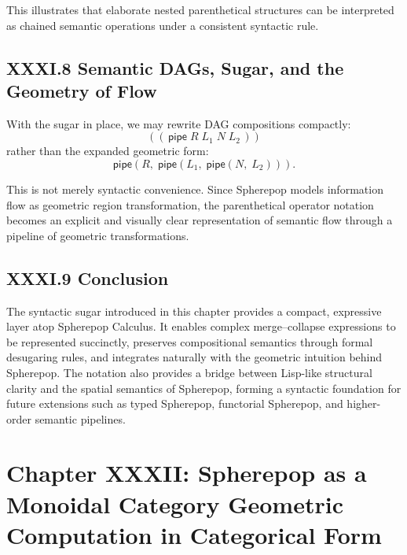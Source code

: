 \documentclass[12pt,letterpaper]{article}
\begin{document}
This illustrates that elaborate nested parenthetical structures can be interpreted as chained semantic operations under a consistent syntactic rule.

\subsection{XXXI.8 Semantic DAGs, Sugar, and the Geometry of Flow}

With the sugar in place, we may rewrite DAG compositions compactly:
\[
((\,\mathsf{pipe}\; R\; L_1\; N\; L_2\,))
\]
rather than the expanded geometric form:
\[
\mathsf{pipe}(R,\; \mathsf{pipe}(L_1,\; \mathsf{pipe}(N,\; L_2))).
\]

This is not merely syntactic convenience. Since Spherepop models information flow as geometric region transformation, the parenthetical operator notation becomes an explicit and visually clear representation of semantic flow through a pipeline of geometric transformations.

\subsection{XXXI.9 Conclusion}

The syntactic sugar introduced in this chapter provides a compact, expressive layer atop Spherepop Calculus. It enables complex merge--collapse expressions to be represented succinctly, preserves compositional semantics through formal desugaring rules, and integrates naturally with the geometric intuition behind Spherepop. The notation also provides a bridge between Lisp-like structural clarity and the spatial semantics of Spherepop, forming a syntactic foundation for future extensions such as typed Spherepop, functorial Spherepop, and higher-order semantic pipelines.

\newpage

\section{Chapter XXXII: Spherepop as a Monoidal Category  
Geometric Computation in Categorical Form}
\end{document}
